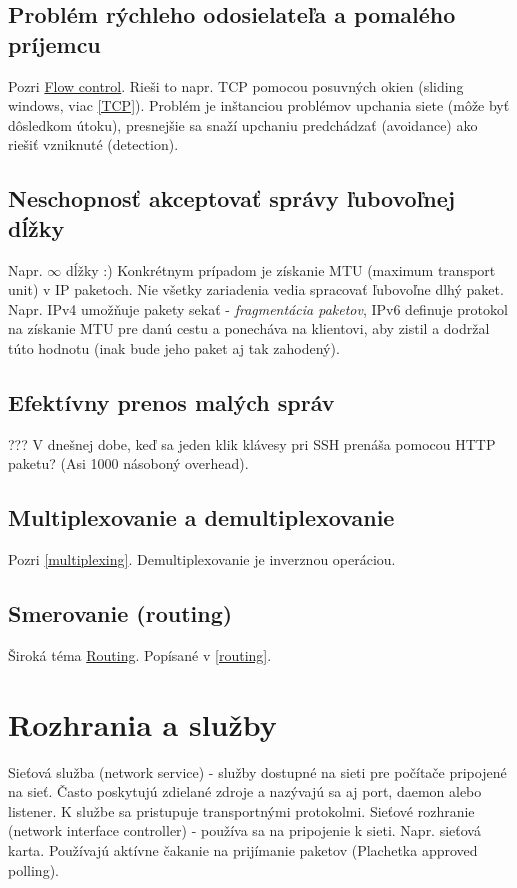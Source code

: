 \documentclass[10pt,a4paper]{article}
\begin{document}
\subsection{Problém rýchleho odosielateľa a pomalého príjemcu}
Pozri \href{http://en.wikipedia.org/wiki/Flow\_control}{Flow control}.
Rieši to napr. TCP pomocou posuvných okien (sliding windows, viac \ref{TCP}).
Problém je inštanciou problémov upchania siete (môže byť dôsledkom útoku),
presnejšie sa snaží upchaniu predchádzať (avoidance) ako riešiť vzniknuté (detection).
  
\subsection{Neschopnosť akceptovať správy ľubovoľnej dĺžky}  
Napr. $\infty$ dĺžky :)
Konkrétnym prípadom je získanie MTU (maximum transport unit) v IP paketoch. 
Nie všetky zariadenia vedia spracovať ľubovoľne dlhý paket. Napr. IPv4 umožňuje pakety sekať - \emph{fragmentácia paketov}, IPv6 definuje protokol na získanie MTU pre danú cestu a ponecháva na klientovi, aby zistil a dodržal túto hodnotu (inak bude jeho paket aj tak zahodený).

\subsection{Efektívny prenos malých správ} 
???
V dnešnej dobe, keď sa jeden klik klávesy pri SSH prenáša pomocou HTTP paketu?
(Asi 1000 násoboný overhead).
      
\subsection{Multiplexovanie a demultiplexovanie}  
Pozri \ref{multiplexing}. Demultiplexovanie je inverznou operáciou. 

\subsection{Smerovanie (routing)}   
Široká téma \href{http://en.wikipedia.org/wiki/Routing}{Routing}. 
Popísané v \ref{routing}.
              
                                                         
\section{Rozhrania a služby}                
Sieťová služba (network service) - služby dostupné na sieti pre počítače pripojené na sieť. Často poskytujú zdielané zdroje a nazývajú sa aj port, daemon alebo listener.  K službe sa pristupuje transportnými protokolmi. 
Sieťové rozhranie (network interface controller) - používa sa na pripojenie k sieti. Napr. sieťová karta. Používajú aktívne čakanie na prijímanie paketov (Plachetka approved polling). 
     
\end{document}
